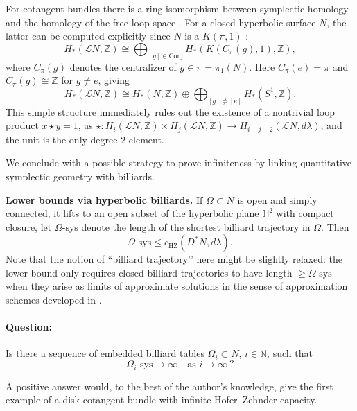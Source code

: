 \documentclass[11pt]{article}
\theoremstyle{definition}
\begin{document}
\begin{enumerate}
For cotangent bundles there is a ring isomorphism between symplectic homology and the homology of the free loop space \cite{Abo15}.
For a closed hyperbolic surface $N$, the latter can be computed explicitly since $N$ is a $K(\pi,1)$ \cite[Ch.\ 1.4]{LO15}:
$$
H_*(\mathcal{L}N,\mathbb{Z})
\cong
\bigoplus_{[g]\in \mathrm{Conj}} H_*(K(C_\pi(g),1),\mathbb{Z}),
$$
where $C_\pi(g)$ denotes the centralizer of $g\in\pi=\pi_1(N)$.  
Here $C_\pi(e)=\pi$ and $C_\pi(g)\cong\mathbb{Z}$ for $g\neq e$, giving
$$
H_*(\mathcal{L}N,\mathbb{Z})
\cong
H_*(N,\mathbb{Z})
\oplus
\bigoplus_{[g]\neq[e]} H_*(S^1,\mathbb{Z}).
$$
This simple structure immediately rules out the existence 
of a nontrivial loop product $x\star y = 1$, as $\star: H_i(\mathcal{L}N,\mathbb{Z})\times H_j(\mathcal{L}N,\mathbb{Z})\to H_{i+j-2}(\mathcal{L}N,d\lambda)$, and the unit is the only degree $2$ element.
\end{enumerate}

We conclude with a possible strategy to prove infiniteness by linking
quantitative symplectic geometry with billiards.

\textbf{Lower bounds via hyperbolic billiards.} If $\Omega\subset N$ is open and simply connected, it lifts to an open
subset of the hyperbolic plane $\mathbb{H}^{2}$ with compact closure, let
$\Omega\text{-}\mathrm{sys}$ denote the length of the shortest billiard trajectory in
$\Omega$. Then
$$
\Omega\text{-}\mathrm{sys}\le c_{\mathrm{HZ}}(D^{*}N,d\lambda).
$$
Note that the notion of “billiard trajectory’’ here might be slightly relaxed: the lower bound only requires closed billiard trajectories to have length $\ge \Omega\text{-}\mathrm{sys}$ when they arise as limits of approximate solutions in the sense of approximation
schemes developed in \cite{AM11,Voc21}.

\paragraph{Question:} \begin{center}
    Is there a sequence of embedded billiard tables
$\Omega_i\subset N$, $i\in\mathbb{N}$, such that
$$
\Omega_i\text{-}\mathrm{sys}\longrightarrow \infty \quad \text{as } i\to\infty\ ?
$$
\end{center}
A positive answer would, to the best of the author’s knowledge, give the first example of a disk cotangent bundle with infinite Hofer--Zehnder capacity. 


%
%
%
\end{document}

